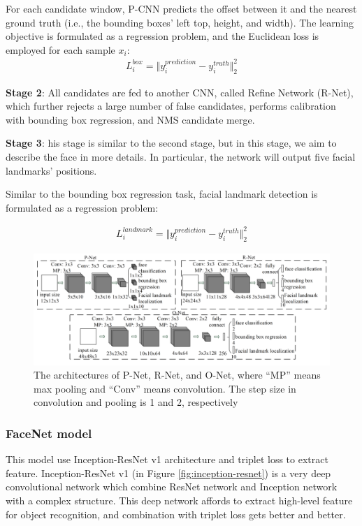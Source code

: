 \documentclass[journal, twocolumn]{IEEEtran}
\begin{document}
For each candidate window, P-CNN predicts the offset between it and the nearest ground truth (i.e., the bounding boxes’ left top, height, and width). The learning objective is formulated as a regression problem, and  the Euclidean loss is employed for each sample $x_i$:
\begin{align}
    L_i^{box} = \Vert y_i^{prediction} - y_i^{truth} \Vert _2^2
\end{align}
        
\textbf{Stage 2}: All candidates are fed to another CNN, called Refine Network (R-Net), which further rejects a large number of false candidates, performs calibration with bounding box regression, and NMS candidate merge.

\textbf{Stage 3}: his stage is similar to the second stage, but in this stage, we aim to describe the face in more details. In particular, the network will output five facial landmarks’ positions.

Similar to the bounding box regression task, facial landmark detection is formulated as a regression problem: 

\begin{align}
	L_i^{landmark} = \Vert y_i^{prediction} - y_i^{truth} \Vert _2^2
\end{align}

\begin{figure}
    \centering
    \includegraphics[width=1\linewidth]{img/mtcnn_arch.png}
	\caption{The architectures of P-Net, R-Net, and O-Net, where “MP” means max pooling and “Conv” means convolution. The step size in convolution and pooling
is 1 and 2, respectively}\label{fig:mtcnn-arch}
\end{figure}


\subsubsection{FaceNet model} 
This model use Inception-ResNet v1 architecture \cite{ref:in-res} and triplet loss to extract feature. Inception-ResNet v1 (in Figure \ref{fig:inception-resnet}) is a very deep convolutional network which combine ResNet network and Inception network with a complex structure. This deep network affords to extract high-level feature for object recognition, and combination with triplet loss gets better and better. 
\end{document}
